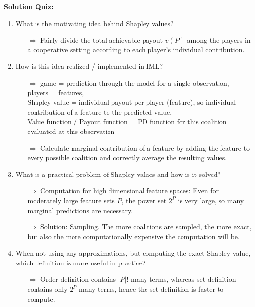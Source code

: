 \textbf{Solution Quiz:}\\\noindent
\medskip

\begin{enumerate}
	\item What is the motivating idea behind Shapley values? 
	\begin{itemize}
		\item[$\Rightarrow$] Fairly divide the total achievable payout $v(P)$ among the players in a cooperative setting according to each player’s individual contribution.
	\end{itemize}
	\item How is this idea realized / implemented in IML?
	\begin{itemize}
		\item[$\Rightarrow$]
        game = prediction through the model for a single observation, \\
        players = features, \\
        Shapley value = individual payout per player (feature), so individual contribution of a feature to the predicted value, \\
        Value function / Payout function = PD function for this coalition evaluated at this observation
		\item[$\Rightarrow$] Calculate marginal contribution of a feature by adding the feature to every possible coalition and correctly average the resulting values.
	\end{itemize}
	\item What is a practical problem of Shapley values and how is it solved?
	\begin{itemize}
		\item[$\Rightarrow$] Computation for high dimensional feature spaces: Even for moderately large feature sets $P$, the power set $2^P$ is very large, so many marginal predictions are necessary.
		\item[$\Rightarrow$] Solution: Sampling. The more coalitions are sampled, the more exact, but also the more computationally expensive the computation will be.
	\end{itemize}
    \item When not using any approximations, but computing the exact Shapley value, which definition is more useful in practice?
	\begin{itemize}
		\item[$\Rightarrow$] Order definition contains $|P|!$ many terms, whereas set definition contains only $2^P$ many terms, hence the set definition is faster to compute.

\end{itemize}
\end{enumerate}
